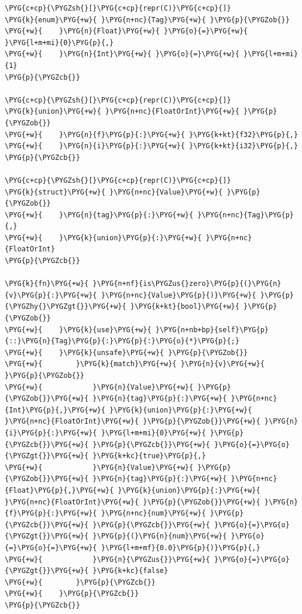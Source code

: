 \begin{Verbatim}[commandchars=\\\{\},breaklines=true,breakanywhere=true,fontsize=\codefont,xleftmargin=17bp]
\PYG{c+cp}{\PYGZsh{}[}\PYG{c+cp}{repr(C)}\PYG{c+cp}{]}
\PYG{k}{enum}\PYG{+w}{ }\PYG{n+nc}{Tag}\PYG{+w}{ }\PYG{p}{\PYGZob{}}
\PYG{+w}{    }\PYG{n}{Float}\PYG{+w}{ }\PYG{o}{=}\PYG{+w}{ }\PYG{l+m+mi}{0}\PYG{p}{,}
\PYG{+w}{    }\PYG{n}{Int}\PYG{+w}{ }\PYG{o}{=}\PYG{+w}{ }\PYG{l+m+mi}{1}
\PYG{p}{\PYGZcb{}}

\PYG{c+cp}{\PYGZsh{}[}\PYG{c+cp}{repr(C)}\PYG{c+cp}{]}
\PYG{k}{union}\PYG{+w}{ }\PYG{n+nc}{FloatOrInt}\PYG{+w}{ }\PYG{p}{\PYGZob{}}
\PYG{+w}{    }\PYG{n}{f}\PYG{p}{:}\PYG{+w}{ }\PYG{k+kt}{f32}\PYG{p}{,}
\PYG{+w}{    }\PYG{n}{i}\PYG{p}{:}\PYG{+w}{ }\PYG{k+kt}{i32}\PYG{p}{,}
\PYG{p}{\PYGZcb{}}

\PYG{c+cp}{\PYGZsh{}[}\PYG{c+cp}{repr(C)}\PYG{c+cp}{]}
\PYG{k}{struct}\PYG{+w}{ }\PYG{n+nc}{Value}\PYG{+w}{ }\PYG{p}{\PYGZob{}}
\PYG{+w}{    }\PYG{n}{tag}\PYG{p}{:}\PYG{+w}{ }\PYG{n+nc}{Tag}\PYG{p}{,}
\PYG{+w}{    }\PYG{k}{union}\PYG{p}{:}\PYG{+w}{ }\PYG{n+nc}{FloatOrInt}
\PYG{p}{\PYGZcb{}}

\PYG{k}{fn}\PYG{+w}{ }\PYG{n+nf}{is\PYGZus{}zero}\PYG{p}{(}\PYG{n}{v}\PYG{p}{:}\PYG{+w}{ }\PYG{n+nc}{Value}\PYG{p}{)}\PYG{+w}{ }\PYG{p}{\PYGZhy{}\PYGZgt{}}\PYG{+w}{ }\PYG{k+kt}{bool}\PYG{+w}{ }\PYG{p}{\PYGZob{}}
\PYG{+w}{    }\PYG{k}{use}\PYG{+w}{ }\PYG{n+nb+bp}{self}\PYG{p}{::}\PYG{n}{Tag}\PYG{p}{:}\PYG{p}{:}\PYG{o}{*}\PYG{p}{;}
\PYG{+w}{    }\PYG{k}{unsafe}\PYG{+w}{ }\PYG{p}{\PYGZob{}}
\PYG{+w}{        }\PYG{k}{match}\PYG{+w}{ }\PYG{n}{v}\PYG{+w}{ }\PYG{p}{\PYGZob{}}
\PYG{+w}{            }\PYG{n}{Value}\PYG{+w}{ }\PYG{p}{\PYGZob{}}\PYG{+w}{ }\PYG{n}{tag}\PYG{p}{:}\PYG{+w}{ }\PYG{n+nc}{Int}\PYG{p}{,}\PYG{+w}{ }\PYG{k}{union}\PYG{p}{:}\PYG{+w}{ }\PYG{n+nc}{FloatOrInt}\PYG{+w}{ }\PYG{p}{\PYGZob{}}\PYG{+w}{ }\PYG{n}{i}\PYG{p}{:}\PYG{+w}{ }\PYG{l+m+mi}{0}\PYG{+w}{ }\PYG{p}{\PYGZcb{}}\PYG{+w}{ }\PYG{p}{\PYGZcb{}}\PYG{+w}{ }\PYG{o}{=}\PYG{o}{\PYGZgt{}}\PYG{+w}{ }\PYG{k+kc}{true}\PYG{p}{,}
\PYG{+w}{            }\PYG{n}{Value}\PYG{+w}{ }\PYG{p}{\PYGZob{}}\PYG{+w}{ }\PYG{n}{tag}\PYG{p}{:}\PYG{+w}{ }\PYG{n+nc}{Float}\PYG{p}{,}\PYG{+w}{ }\PYG{k}{union}\PYG{p}{:}\PYG{+w}{ }\PYG{n+nc}{FloatOrInt}\PYG{+w}{ }\PYG{p}{\PYGZob{}}\PYG{+w}{ }\PYG{n}{f}\PYG{p}{:}\PYG{+w}{ }\PYG{n+nc}{num}\PYG{+w}{ }\PYG{p}{\PYGZcb{}}\PYG{+w}{ }\PYG{p}{\PYGZcb{}}\PYG{+w}{ }\PYG{o}{=}\PYG{o}{\PYGZgt{}}\PYG{+w}{ }\PYG{p}{(}\PYG{n}{num}\PYG{+w}{ }\PYG{o}{=}\PYG{o}{=}\PYG{+w}{ }\PYG{l+m+mf}{0.0}\PYG{p}{)}\PYG{p}{,}
\PYG{+w}{            }\PYG{n}{\PYGZus{}}\PYG{+w}{ }\PYG{o}{=}\PYG{o}{\PYGZgt{}}\PYG{+w}{ }\PYG{k+kc}{false}
\PYG{+w}{        }\PYG{p}{\PYGZcb{}}
\PYG{+w}{    }\PYG{p}{\PYGZcb{}}
\PYG{p}{\PYGZcb{}}
\end{Verbatim}

